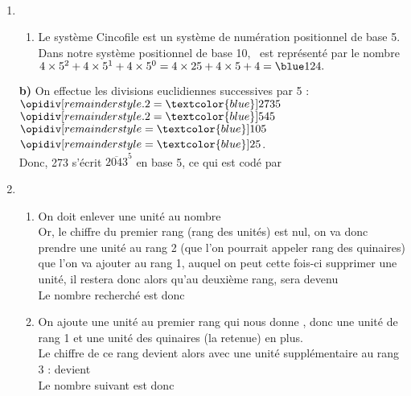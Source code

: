 \ \\ [-5mm]
   \begin{enumerate}
      \item
      \begin{enumerate}
         \item Le système Cincofile est un système de numération positionnel de base 5. \\
         Dans notre système positionnel de base 10, \,    est représenté par le nombre $4\times5^2+4\times5^1+4\times5^0 =4\times25+4\times5+4 ={\blue 124}.$
      \end{enumerate}
   \textcolor{G1}{\bf b)} On effectue les divisions euclidiennes successives par 5 : \\
      $\opidiv[remainderstyle.2=\textcolor{blue}]{273}{5}$ \quad $\opidiv[remainderstyle.2=\textcolor{blue}]{54}{5}$ \quad $\opidiv[remainderstyle=\textcolor{blue}]{10}{5}$ \quad $\opidiv[remainderstyle=\textcolor{blue}]{2}{5}$. \\ [1mm]
      Donc, 273 s'écrit $\overline{2043}^5$ en base 5, ce qui est codé par \, {\blue{}   } \\
      \setcounter{enumi}{1}
      \item
      \begin{enumerate}
          \item On doit enlever une unité au nombre    \\
            Or, le chiffre du premier rang (rang des unités) est nul, on va donc \og prendre \fg{} une unité au rang 2 (que l'on pourrait appeler rang des quinaires) que l'on va ajouter au rang 1, auquel on peut cette fois-ci supprimer une unité, il restera donc  alors qu'au deuxième rang,  sera devenu  \\
Le nombre recherché est donc {\blue {}  }
            \item On ajoute une unité au premier rang  qui nous donne  \fg, donc une unité de rang 1 et une unité des quinaires (la retenue) en plus. \\
            Le chiffre de ce rang devient alors  avec une unité supplémentaire au rang 3 :  devient  \\
            Le nombre suivant \og {}   \fg{} est donc {\blue {}  }
      \end{enumerate}
   \end{enumerate}
